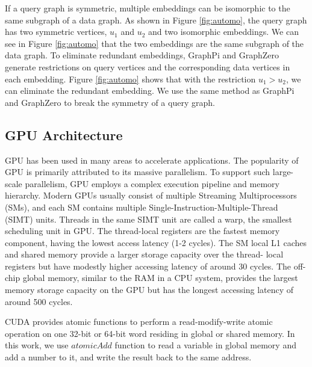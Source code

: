 If a query graph is symmetric, multiple embeddings can be isomorphic to the same subgraph of a data graph. As shown in Figure \ref{fig:automo}, the query graph has two symmetric vertices, $u_1$ and $u_2$ and two isomorphic embeddings. We can see in Figure \ref{fig:automo} that the two embeddings are the same subgraph of the data graph. To eliminate redundant embeddings, GraphPi \cite{shi2020graphpi} and GraphZero \cite{mawhirter2019graphzero} generate restrictions on query vertices and the corresponding data vertices in each embedding. Figure \ref{fig:automo} shows that with the restriction $u_1 > u_2$, we can eliminate the redundant embedding. We use the same method as GraphPi and GraphZero to break the symmetry of a query graph.

\subsection{GPU Architecture}
GPU has been used in many areas to accelerate applications. The popularity of GPU is primarily attributed to its massive parallelism. To support such large-scale parallelism, GPU employs a complex execution pipeline and memory hierarchy. Modern GPUs usually consist of multiple Streaming Multiprocessors (SMs), and each SM contains multiple Single-Instruction-Multiple-Thread (SIMT) units. Threads in the same SIMT unit are called a warp, the smallest scheduling unit in GPU. The thread-local registers are the fastest memory component, having the lowest access latency (1-2 cycles). The SM local L1 caches and shared memory provide a larger storage capacity over the thread- local registers but have modestly higher accessing latency of around 30 cycles. The off-chip global memory, similar to the RAM in a CPU system, provides the largest memory storage capacity on the GPU but has the longest accessing latency of around 500 cycles.

CUDA provides atomic functions to perform a read-modify-write atomic operation on one 32-bit or 64-bit word residing in global or shared memory. In this work, we use $atomicAdd$ function to read a variable in global memory and add a number to it, and write the result back to the same address.

